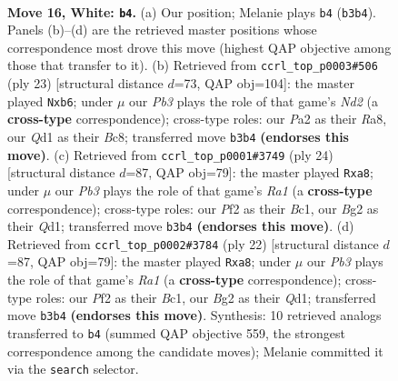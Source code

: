 \documentclass[11pt]{article}
\begin{document}
\clearpage

\begin{figure}[p]\centering
\begin{subfigure}{0.46\textwidth}\centering
\resizebox{\linewidth}{!}{%
\newchessgame
\chessboard[
  setfen={rn1qk2r/p3bp2/b4np1/3p2N1/2p5/1PN3P1/P2BPPB1/R2Q1RK1 w kq - 0 16},
  showmover=false,
  pgfstyle=straightmove, color=movearrow, markmove={b3-b4}
]}
\caption{}
\end{subfigure}\hfill
\begin{subfigure}{0.46\textwidth}\centering
\resizebox{\linewidth}{!}{%
\newchessgame
\chessboard[
  setfen={r1bq1rk1/p2nppbp/1Pnp2p1/8/2PP4/R1N2N2/1P2BPPP/2BQK2R b K - 0 12},
  showmover=false,
  pgfstyle=straightmove, color=movearrow, markmove={d7-b6}
]}
\caption{}
\end{subfigure}
\\[4pt]
\begin{subfigure}{0.46\textwidth}\centering
\resizebox{\linewidth}{!}{%
\newchessgame
\chessboard[
  setfen={r2qkb1r/1b3ppp/2n2n2/1ppp4/8/1BN1PN2/1P3PPP/R1BQ1RK1 w kq - 0 13},
  showmover=false,
  pgfstyle=straightmove, color=movearrow, markmove={a1-a8}
]}
\caption{}
\end{subfigure}\hfill
\begin{subfigure}{0.46\textwidth}\centering
\resizebox{\linewidth}{!}{%
\newchessgame
\chessboard[
  setfen={r2qkb1r/1b3ppp/2n2n2/1ppp4/8/1BN1PN2/1P3PPP/R1BQ1RK1 w kq - 0 12},
  showmover=false,
  pgfstyle=straightmove, color=movearrow, markmove={a1-a8}
]}
\caption{}
\end{subfigure}
\caption{\textbf{Move 16, White: \texttt{b4}.} (a) Our position; Melanie plays \texttt{b4} (\texttt{b3b4}). Panels (b)--(d) are the retrieved master positions whose correspondence most drove this move (highest QAP objective among those that transfer to it). (b) Retrieved from \texttt{ccrl\_top\_p0003\#506} (ply 23) [structural distance $d$=73, QAP obj=104]: the master played \texttt{Nxb6}; under $\mu$ our \emph{Pb3} plays the role of that game's \emph{Nd2} (a \textbf{cross-type} correspondence); cross-type roles: our \emph{P}a2 as their \emph{R}a8, our \emph{Q}d1 as their \emph{B}c8; transferred move \texttt{b3b4} \textbf{(endorses this move)}. (c) Retrieved from \texttt{ccrl\_top\_p0001\#3749} (ply 24) [structural distance $d$=87, QAP obj=79]: the master played \texttt{Rxa8}; under $\mu$ our \emph{Pb3} plays the role of that game's \emph{Ra1} (a \textbf{cross-type} correspondence); cross-type roles: our \emph{P}f2 as their \emph{B}c1, our \emph{B}g2 as their \emph{Q}d1; transferred move \texttt{b3b4} \textbf{(endorses this move)}. (d) Retrieved from \texttt{ccrl\_top\_p0002\#3784} (ply 22) [structural distance $d$=87, QAP obj=79]: the master played \texttt{Rxa8}; under $\mu$ our \emph{Pb3} plays the role of that game's \emph{Ra1} (a \textbf{cross-type} correspondence); cross-type roles: our \emph{P}f2 as their \emph{B}c1, our \emph{B}g2 as their \emph{Q}d1; transferred move \texttt{b3b4} \textbf{(endorses this move)}. Synthesis: 10 retrieved analogs transferred to \texttt{b4} (summed QAP objective 559, the strongest correspondence among the candidate moves); Melanie committed it via the \texttt{search} selector.}
\label{fig:thought-m30}
\end{figure}
\end{document}
